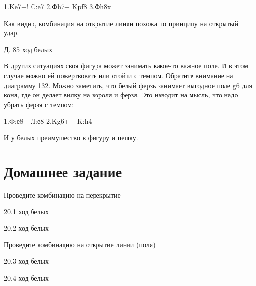 1.Ke7+! C:e7 2.Фh7+ Kpf8 3.Фh8x

Как видно, комбинация на открытие линии похожа по принципу на открытый удар.
 
Д. 85 ход белых

В других ситуациях своя фигура может занимать какое-то важное поле. И в этом случае можно ей пожертвовать или отойти с темпом. Обратите внимание на диаграмму 132. Можно заметить, что белый ферзь занимает выгодное поле g6 для коня, где он делает вилку на короля и ферзя. Это наводит на мысль, что надо убрать ферзя с темпом:

1.Ф:е8+ Л:е8 2.Kg6+ ~ K:h4

И у белых преимущество в фигуру и пешку.

\section{Домашнее задание}

Проведите комбинацию на перекрытие
 
 
20.1 ход белых
 
20.2 ход белых
 
Проведите комбинацию на открытие линии (поля)
 
 
20.3 ход белых
 
20.4 ход белых
 